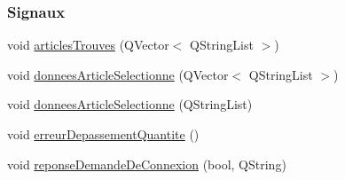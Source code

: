 \subsubsection*{Signaux}
\begin{DoxyCompactItemize}
\item 
void \hyperlink{class_supervision_a3023468d106abfe7dc697e61a63778ed}{articles\+Trouves} (Q\+Vector$<$ Q\+String\+List $>$)
\item 
void \hyperlink{class_supervision_ae486eafc331964e223c35ae2b54fa669}{donnees\+Article\+Selectionne} (Q\+Vector$<$ Q\+String\+List $>$)
\item 
void \hyperlink{class_supervision_ae01e53be90edf2656432c5da56331b9d}{donnees\+Article\+Selectionne} (Q\+String\+List)
\item 
void \hyperlink{class_supervision_a3fb19a3c16324a21af956fd272ca469d}{erreur\+Depassement\+Quantite} ()
\item 
void \hyperlink{class_supervision_a116ed6de0e9e3c9c94886235e9f6d6e8}{reponse\+Demande\+De\+Connexion} (bool, Q\+String)
\end{DoxyCompactItemize}
